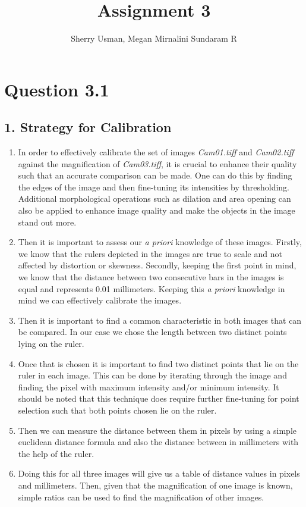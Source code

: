 \documentclass{article}
\title{Assignment 3 }
\author{Sherry Usman, Megan Mirnalini Sundaram R }
\begin{document}
\maketitle


\section*{Question 3.1}
\subsection*{1. Strategy for Calibration}
\begin{enumerate}
\item In order to effectively calibrate the set of images \emph{Cam01.tiff} and \emph{Cam02.tiff}  against the magnification of \emph{Cam03.tiff}, it is crucial to enhance their quality such that an accurate comparison can be made. One can do this by finding the edges of the image and then fine-tuning its intensities by thresholding. Additional morphological operations such as dilation and area opening can also be applied to enhance image quality and make the objects in the image stand out more. 
\item Then it is important to assess our \emph{a priori} knowledge of these images. Firstly, we know that the rulers depicted in the images are true to scale and not affected by distortion or skewness. Secondly, keeping the first point in mind, we know that the distance between two consecutive bars in the images is equal and represents 0.01 millimeters. Keeping this \emph{a priori} knowledge in mind we can effectively calibrate the images.  
\item Then it is important to find a common characteristic in both images that can be compared. In our case we chose the length between two distinct points lying on the ruler.
\item Once that is chosen it is important to find two distinct points that lie on the ruler in each image. This can be done by iterating through the image and finding the pixel with maximum intensity and/or minimum intensity. It should be noted that this technique does require further fine-tuning for point selection such that both points chosen lie on the ruler.
\item Then we can  measure the distance between them in pixels by using a simple euclidean distance formula and also the distance between in millimeters with the help of the ruler. 
\item Doing this for all three images will give us a table of distance values in pixels and millimeters. Then, given that the magnification of one image is known, simple ratios can be used to find the magnification of other images.
\end{enumerate}
\end{document}
